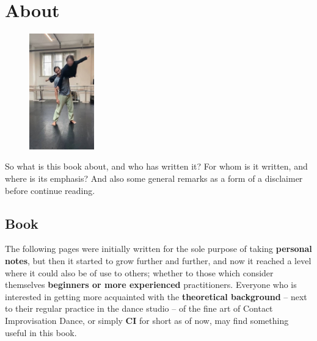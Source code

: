 \chapter{About}\label{ch:about}

\begin{figure}
\centering
\includegraphics[width=0.25\textwidth]{images/about}
\end{figure}

So what is this book about, and who has written it?
For whom is it written, and where is its emphasis?
And also some general remarks as a form of a disclaimer before continue reading.

\section{Book}\label{sec:book}

The following pages were initially written for the sole purpose of taking \textbf{personal notes}, but then it started to grow further and further, and now it reached a level where it could also be of use to others; whether to those which consider themselves \textbf{beginners or more experienced} practitioners.
Everyone who is interested in getting more acquainted with the \textbf{theoretical background} -- next to their regular practice in the dance studio -- of the fine art of Contact Improvisation Dance, or simply \textbf{CI} for short as of now, may find something useful in this book.


